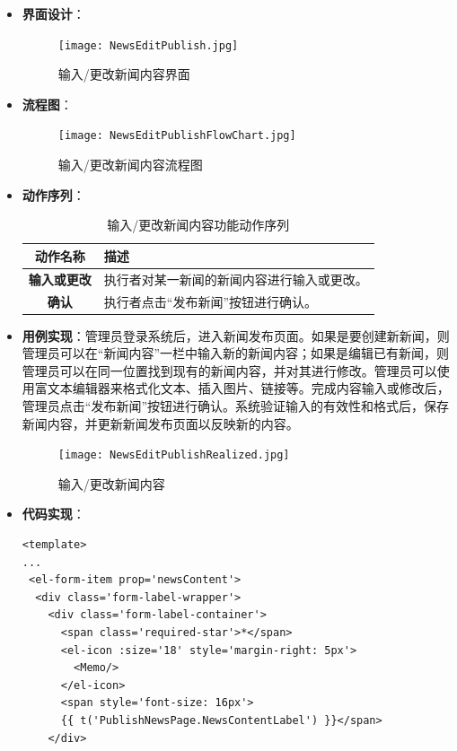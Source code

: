 \begin{itemize}
	\item \textbf{界面设计}：
	\begin{figure}[H]
		\centering
		\texttt{[image: NewsEditPublish.jpg]}
		\caption{输入/更改新闻内容界面}
		\label{NewsEditPublish}
	\end{figure}
	\item \textbf{流程图}：
	\begin{figure}[H]
		\centering
		\texttt{[image: NewsEditPublishFlowChart.jpg]}
		\caption{输入/更改新闻内容流程图}
		\label{NewsEditPublishFlowChart}
	\end{figure}
	\item \textbf{动作序列}：
	\begin{table}[H]
		\centering
		\caption{输入/更改新闻内容功能动作序列}
		\renewcommand\arraystretch{1.5}
		\begin{tabular}{|c|>{\raggedright\arraybackslash}p{10cm}|}
			\hline
			\textbf{动作名称} & \textbf{描述} \\ \hline
			\textbf{输入或更改} & 执行者对某一新闻的新闻内容进行输入或更改。 \\ \hline
			\textbf{确认} & 执行者点击“发布新闻”按钮进行确认。 \\ \hline
		\end{tabular}
	\end{table}
	\item \textbf{用例实现}：管理员登录系统后，进入新闻发布页面。如果是要创建新新闻，则管理员可以在“新闻内容”一栏中输入新的新闻内容；如果是编辑已有新闻，则管理员可以在同一位置找到现有的新闻内容，并对其进行修改。管理员可以使用富文本编辑器来格式化文本、插入图片、链接等。完成内容输入或修改后，管理员点击“发布新闻”按钮进行确认。系统验证输入的有效性和格式后，保存新闻内容，并更新新闻发布页面以反映新的内容。
	\begin{figure}[H]
		\centering
		\texttt{[image: NewsEditPublishRealized.jpg]}
		\caption{输入/更改新闻内容}
		\label{NewsEditPublishRealized}
	\end{figure}
	\item \textbf{代码实现}：
	\begin{verbatim}
<template>
...
 <el-form-item prop='newsContent'>
  <div class='form-label-wrapper'>
    <div class='form-label-container'>
      <span class='required-star'>*</span>
      <el-icon :size='18' style='margin-right: 5px'>
        <Memo/>
      </el-icon>
      <span style='font-size: 16px'>
      {{ t('PublishNewsPage.NewsContentLabel') }}</span>
    </div>
	

\end{verbatim}
\end{itemize}
